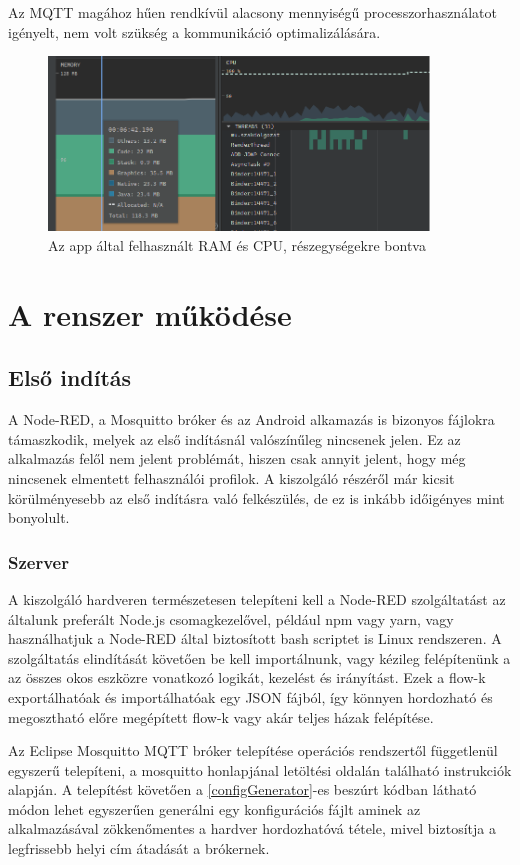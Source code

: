 \documentclass[
]{thesis-ekf}
\theoremstyle{definition}
\theoremstyle{remark}
\begin{document}
Az MQTT magához hűen rendkívül alacsony mennyiségű processzorhasználatot igényelt, nem volt szükség a kommunikáció
optimalizálására.
\begin{figure}
	\centering
	\includegraphics[width=0.9\textwidth]{images/profiler_ram_cpu.png}
	\caption{Az app által felhasznált RAM és CPU, részegységekre bontva}
	\label{usage}
\end{figure}

\chapter{A renszer működése}
\section{Első indítás}
A Node-RED, a Mosquitto bróker és az Android alkamazás is bizonyos fájlokra támaszkodik, melyek az első indításnál
valószínűleg nincsenek jelen. Ez az alkalmazás felől nem jelent problémát, hiszen csak annyit jelent, hogy még nincsenek
elmentett felhasználói profilok. A kiszolgáló részéről már kicsit körülményesebb az első indításra való felkészülés,
de ez is inkább időigényes mint bonyolult.
\subsection{Szerver}
A kiszolgáló hardveren természetesen telepíteni kell a Node-RED szolgáltatást az általunk preferált Node.js
csomagkezelővel, például npm vagy yarn, vagy használhatjuk a Node-RED által biztosított bash scriptet is Linux rendszeren.
A szolgáltatás elindítását követően be kell importálnunk, vagy kézileg felépítenünk a az összes okos eszközre vonatkozó
logikát, kezelést és irányítást. Ezek a flow-k exportálhatóak és importálhatóak egy JSON fájból, így könnyen hordozható
és megosztható előre megépített flow-k vagy akár teljes házak felépítése.

Az Eclipse Mosquitto MQTT bróker telepítése operációs rendszertől függetlenül egyszerű telepíteni, a mosquitto
honlapjánal letöltési oldalán található instrukciók alapján. A telepítést követően a \ref{configGenerator}-es
beszúrt kódban látható módon lehet egyszerűen generálni egy konfigurációs fájlt aminek az alkalmazásával
zökkenőmentes a hardver hordozhatóvá tétele, mivel biztosítja a legfrissebb helyi cím átadását a brókernek.
\end{document}
